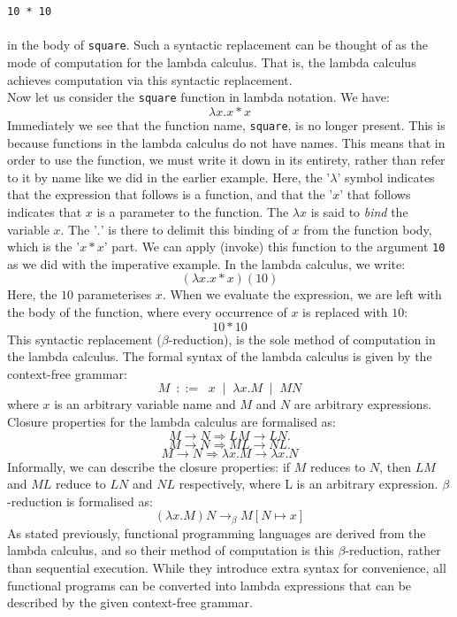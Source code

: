 \documentclass{article}
\begin{document}
\\\\
\indent \texttt{10 * 10}
\\\\
in the body of \texttt{square}. Such a syntactic replacement can be thought of as the mode of computation for the lambda calculus. That is, the lambda calculus achieves computation via this syntactic replacement.
\\
\indent Now let us consider the \texttt{square} function in lambda notation. We have:
\[ \lambda x.x * x \]
Immediately we see that the function name, \texttt{square}, is no longer present. This is because functions in the lambda calculus do not have names. This means that in order to use the function, we must write it down in its entirety, rather than refer to it by name like we did in the earlier example. Here, the '$\lambda$' symbol indicates that the expression that follows is a function, and that the '$x$' that follows indicates that $x$ is a parameter to the function. The $\lambda x$ is said to \emph{bind} the variable $x$. The '$.$' is there to delimit this binding of $x$ from the function body, which is the '$x * x$' part. We can apply (invoke) this function to the argument \texttt{10} as we did with the imperative example. In the lambda calculus, we write:
\[ (\lambda x.x * x)(10) \]
Here, the $10$ parameterises $x$. When we evaluate the expression, we are left with the body of the function, where every occurrence of $x$ is replaced with $10$:
\[ 10 * 10 \]
This syntactic replacement ($\beta$-reduction), is the sole method of computation in the lambda calculus. The formal syntax of the lambda calculus is given by the context-free grammar:
\[ M \:\; ::= \;\; x \;\; | \;\; \lambda x.M \;\; | \;\;  MN \]
where $x$ is an arbitrary variable name and $M$ and $N$ are arbitrary expressions. Closure properties for the lambda calculus are formalised as:
\[ M \rightarrow N \Rightarrow LM \rightarrow LN. \]
\[ M \rightarrow N \Rightarrow ML \rightarrow NL. \]
\[ M \rightarrow N \Rightarrow \lambda x.M \rightarrow \lambda x.N \]
Informally, we can describe the closure properties: if $M$ reduces to $N$, then $LM$ and $ML$ reduce to $LN$ and $NL$ respectively, where L is an arbitrary expression. $\beta$-reduction is formalised as:
\[ (\lambda x.M)N \rightarrow_\beta M[N \mapsto x] \]
\indent As stated previously, functional programming languages are derived from the lambda calculus, and so their method of computation is this $\beta$-reduction, rather than sequential execution. While they introduce extra syntax for convenience, all functional programs can be converted into lambda expressions that can be described by the given context-free grammar.
\end{document}
